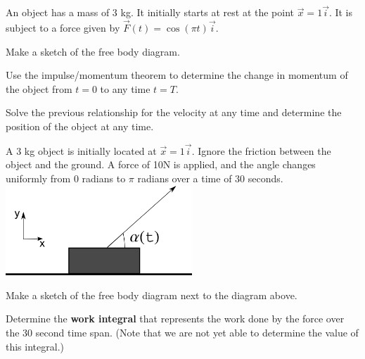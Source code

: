 \begin{problem}
\item An object has a mass of 3 kg. It initially starts at rest at the
  point $\vec{x}=1\vec{i}$. It is subject to a force given by
  $\vec{F}(t) = \cos(\pi t) \vec{i}$.
  \begin{subproblem}
    \item Make a sketch of the free body diagram.
      \vspace{5em}
    \item Use the impulse/momentum theorem to determine the change in
      momentum of the object from $t=0$ to any time $t=T$.
      \vfill
    \item Solve the previous relationship for the velocity at any time
      and determine the position of the object at any time.
      \vfill
  \end{subproblem}

  \clearpage

\item A 3 kg object is initially located at $\vec{x}=1\vec{i}$. Ignore
  the friction between the object and the ground. A force of 10N is
  applied, and the angle changes uniformly from 0 radians
  to $\pi$ radians over a time of 30 seconds.\\
  \includegraphics[width=7cm]{ink/week9/workAngleChanging}
  \begin{subproblem}
    \item Make a sketch of the free body diagram next to the diagram above.
    \item Determine the \textbf{work integral} that represents the
      work done by the force over the 30 second time span.  (Note that
      we are not yet able to determine the value of this integral.)

      \vfill

  \end{subproblem}
\end{problem}

